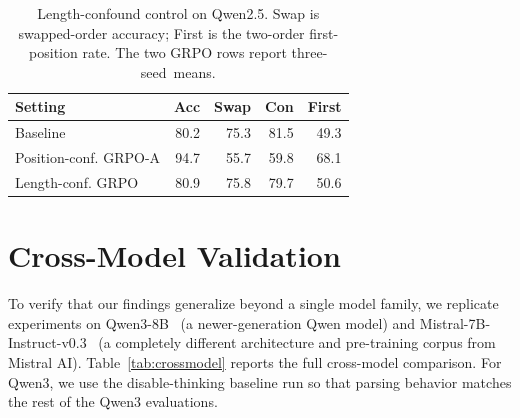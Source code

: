 \documentclass[letterpaper]{article}
\begin{document}
\begin{table}[H]
\centering
\scriptsize
\setlength{\tabcolsep}{3pt}
\begin{tabular}{@{}lrrrr@{}}
\toprule
\textbf{Setting} & \textbf{Acc} & \textbf{Swap} & \textbf{Con} & \textbf{First} \\
\midrule
Baseline & 80.2 & 75.3 & 81.5 & 49.3 \\
Position-conf. GRPO-A & 94.7 & 55.7 & 59.8 & 68.1 \\
Length-conf. GRPO & 80.9 & 75.8 & 79.7 & 50.6 \\
\bottomrule
\end{tabular}
\caption{Length-confound control on Qwen2.5. Swap is swapped-order accuracy; First is the two-order first-position rate. The two GRPO rows report \mbox{three-seed means}.}
\label{tab:length}
\end{table}

\section{Cross-Model Validation}
\label{app:crossmodel}

To verify that our findings generalize beyond a single model family, we replicate experiments on Qwen3-8B~\citep{qwen2025qwen3} (a newer-generation Qwen model) and Mistral-7B-Instruct-v0.3~\citep{jiang2023mistral} (a completely different architecture and pre-training corpus from Mistral AI). Table~\ref{tab:crossmodel} reports the full cross-model comparison. For Qwen3, we use the disable-thinking baseline run so that parsing behavior matches the rest of the Qwen3 evaluations.
\end{document}
